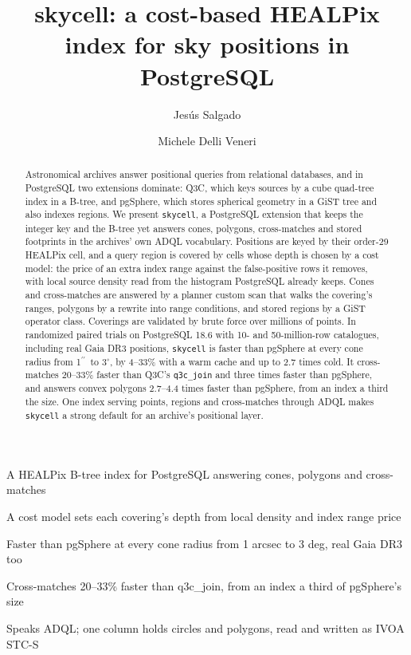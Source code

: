 \documentclass[preprint,12pt]{elsarticle}
\newcommand{\arcsec}{\ensuremath{^{\prime\prime}}}
\newcommand{\degr}{\ensuremath{^{\circ}}}
\begin{document}
\begin{frontmatter}

\title{skycell: a cost-based HEALPix index for sky positions in PostgreSQL}

\author[skao]{Jes\'us Salgado}
\author[skao]{Michele Delli Veneri}

\begin{abstract}
Astronomical archives answer positional queries from relational databases, and in
PostgreSQL two extensions dominate: Q3C, which keys sources by a cube quad-tree index in
a B-tree, and pgSphere, which stores spherical geometry in a GiST tree and also indexes
regions. We present \texttt{skycell}, a PostgreSQL extension that keeps the integer key
and the B-tree yet answers cones, polygons, cross-matches and stored footprints in the
archives' own ADQL vocabulary. Positions are keyed by their order-29 HEALPix cell, and a
query region is covered by cells whose depth is chosen by a cost model: the price of an
extra index range against the false-positive rows it removes, with local source density
read from the histogram PostgreSQL already keeps. Cones and cross-matches are answered by
a planner custom scan that walks the covering's ranges, polygons by a rewrite into range
conditions, and stored regions by a GiST operator class. Coverings are validated by
brute force over millions of points. In randomized paired trials on PostgreSQL 18.6 with
10- and 50-million-row catalogues, including real Gaia DR3 positions, \texttt{skycell}
is faster than pgSphere at every cone radius from 1\arcsec\ to 3\degr, by 4--33\% with a
warm cache and up to 2.7 times cold. It cross-matches 20--33\% faster than Q3C's
\texttt{q3c\_join} and three times faster than pgSphere, and answers convex polygons
2.7--4.4 times faster than pgSphere, from an index a third the size. One index serving
points, regions and cross-matches through ADQL makes \texttt{skycell} a strong default
for an archive's positional layer.
\end{abstract}

\begin{highlights}
\item A HEALPix B-tree index for PostgreSQL answering cones, polygons and cross-matches
\item A cost model sets each covering's depth from local density and index range price
\item Faster than pgSphere at every cone radius from 1 arcsec to 3 deg, real Gaia DR3 too
\item Cross-matches 20--33\% faster than q3c\_join, from an index a third of pgSphere's size
\item Speaks ADQL; one column holds circles and polygons, read and written as IVOA STC-S
\end{highlights}


\end{frontmatter}
\end{document}
